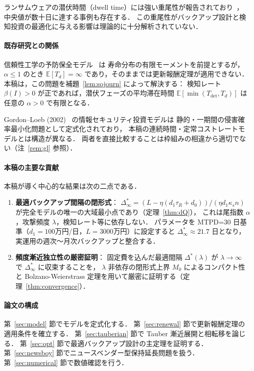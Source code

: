 \documentclass[12pt,a4paper]{article}
\theoremstyle{plain}
\theoremstyle{definition}
\theoremstyle{remark}
\newcommand{\E}{\mathbb{E}}
\newcommand{\Tdet}{T_{\mathrm{det}}}
\newcommand{\betaI}{\beta(I)}
\newcommand{\Dopt}{\Delta^{*}}
\newcommand{\Dinf}{\Delta^{*}_{\infty}}
\begin{document}
ランサムウェアの潜伏時間（dwell time）には強い重尾性が報告されており~\cite{mandiant2023,ibm2023,gruber2022}，
中央値が数十日に達する事例も存在する．
この重尾性がバックアップ設計と検知投資の最適化に与える影響は理論的に十分解析されていない．

\paragraph{既存研究との関係}
信頼性工学の予防保全モデル~\cite{barlow1965,nakagawa2005} は
寿命分布の有限モーメントを前提とするが，
$\alpha\le1$ のとき $\E[T_d]=\infty$ であり，そのままでは更新報酬定理が適用できない．
本稿は，この問題を補題~\ref{lem:sojourn} によって解決する：
検知レート $\betaI>0$ が正であれば，潜伏フェーズの平均滞在時間 $\E[\min(\Tdet,T_d)]$ は
任意の $\alpha>0$ で有限となる．

Gordon--Loeb (2002)~\cite{gordon2002} の情報セキュリティ投資モデルは
静的・一期間の侵害確率最小化問題として定式化されており，
本稿の連続時間・定常コストレートモデルとは構造が異なる．
両者を直接比較することは枠組みの相違から適切でない（注~\ref{rem:gl} 参照）．

\paragraph{本稿の主要な貢献}
本稿が導く中心的な結果は次の二点である．
\begin{enumerate}[leftmargin=*]
\item \textbf{最適バックアップ間隔の閉形式}：
  $\Dinf=(L-\eta(d_1\tau_R+d_0))/(\eta d_1\kappa_s n)$
  が完全モデルの唯一の大域最小点であり（定理~\ref{thm:dQ}），
  これは尾指数 $\alpha$，攻撃頻度 $\lambda$，検知レート等に依存しない．
  パラメータを MTPD=30 日基準（$d_1=100$万円/日，$L=3000$万円）に設定すると
  $\Dinf\approx21.7$ 日となり，実運用の週次〜月次バックアップと整合する．
\item \textbf{頻度漸近独立性の厳密証明}：
  固定費を込んだ最適間隔 $\Dopt(\lambda)$ が
  $\lambda\to\infty$ で $\Dinf$ に収束することを，
  $\lambda$ 非依存の閉形式上界 $M_0$ によるコンパクト性と
  Bolzano-Weierstrass 定理を用いて厳密に証明する（定理~\ref{thm:convergence}）．
\end{enumerate}

\paragraph{論文の構成}
第~\ref{sec:model} 節でモデルを定式化する．
第~\ref{sec:renewal} 節で更新報酬定理の適用条件を確立する．
第~\ref{sec:tauberian} 節で Tauber 漸近展開と相転移を論じる．
第~\ref{sec:opt} 節で最適バックアップ設計の主定理を証明する．
第~\ref{sec:newsboy} 節でニュースベンダー型保持延長問題を扱う．
第~\ref{sec:numerical} 節で数値確認を行う．
\end{document}
